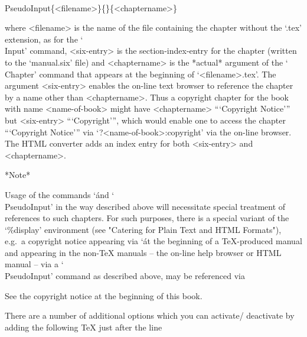 \)\\PseudoInput\{<filename>\}\{<six-entry>\}\{<chaptername>\}

\item{}
where <filename> is the name of the file containing the  chapter  without
the `.tex' extension, as for the `\\Input' command,  <six-entry>  is  the
section-index-entry for the chapter (written to  the  `manual.six'  file)
and <chaptername> is the *actual* argument  of  the  `\\Chapter'  command
that  appears  at  the  beginning  of  `<filename>.tex'.   The   argument
<six-entry> enables the on-line text browser to reference the chapter  by
a name other than <chaptername>. Thus a copyright chapter  for  the  book
with name <name-of-book> might have <chaptername> ```Copyright  Notice'''
but <six-entry> ```Copyright''', which would enable  one  to  access  the
chapter ```Copyright Notice''' via  `?<name-of-book>:copyright'  via  the
on-line browser.  The  HTML  converter  adds  an  index  entry  for  both
<six-entry> and <chaptername>.

\endlist

*Note*

Usage of the commands `\' and `\\PseudoInput' in the way  described
above will necessitate special treatment of references to such  chapters.
For such  purposes,  there  is  a  special  variant  of  the  `\%display'
environment (see "Catering for Plain  Text  and  HTML  Formats"),  e.g.~a
copyright  notice  appearing  via  `\'  at  the  beginning   of   a
{\TeX}-produced manual and appearing in the  non-{\TeX}  manuals  --  the
on-line help browser or HTML manual -- via a `\\PseudoInput'  command  as
described above, may be referenced via

\begintt
See the copyright notice at the beginning of this book.
\endtt


\label{options!for gapmacro.tex}

There are a number of additional options which you can activate/
deactivate by adding the following {\TeX} just after the line

